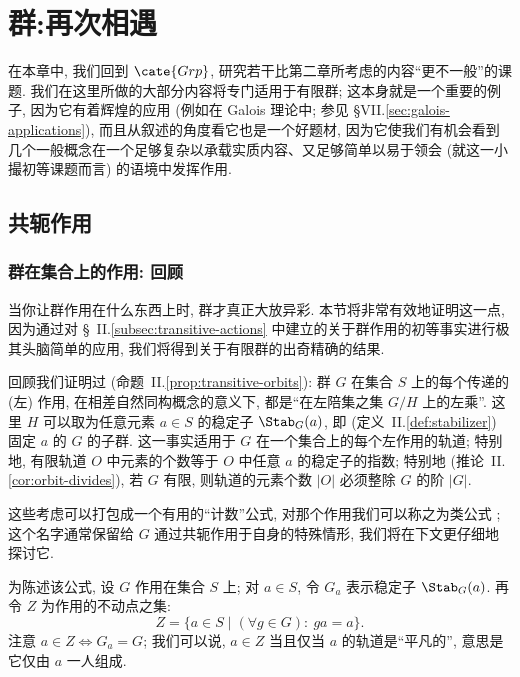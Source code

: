 
\chapter{群:再次相遇}
\label{chap:groups2}

在本章中, 我们回到 $\cate{Grp}$, 研究若干比第二章所考虑的内容``更不一般''的课题. 我们在这里所做的大部分内容将专门适用于有限群; 这本身就是一个重要的例子, 因为它有着辉煌的应用 (例如在 Galois 理论中; 参见 \S VII.\ref{sec:galois-applications}), 而且从叙述的角度看它也是一个好题材, 因为它使我们有机会看到几个一般概念在一个足够复杂以承载实质内容、又足够简单以易于领会 (就这一小撮初等课题而言) 的语境中发挥作用.

\section{共轭作用}
\label{sec:conjugation}

\subsection{群在集合上的作用: 回顾}
\label{subsec:actions-reminder}

当你让群作用在什么东西上时, 群才真正大放异彩. 本节将非常有效地证明这一点, 因为通过对 \S~II.\ref{subsec:transitive-actions} 中建立的关于群作用的初等事实进行极其头脑简单的应用, 我们将得到关于有限群的出奇精确的结果.

回顾我们证明过 (命题~II.\ref{prop:transitive-orbits}): 群 $G$ 在集合 $S$ 上的每个传递的 (左) 作用, 在相差自然同构概念的意义下, 都是``在左陪集之集 $G/H$ 上的左乘''. 这里 $H$ 可以取为任意元素 $a \in S$ 的稳定子 $\Stab_G(a)$, 即 (定义~II.\ref{def:stabilizer}) 固定 $a$ 的 $G$ 的子群. 这一事实适用于 $G$ 在一个集合上的每个左作用的轨道; 特别地, 有限轨道 $O$ 中元素的个数等于 $O$ 中任意 $a$ 的稳定子的指数; 特别地 (推论~II.\ref{cor:orbit-divides}), 若 $G$ 有限, 则轨道的元素个数 $|O|$ 必须整除 $G$ 的阶 $|G|$.

这些考虑可以打包成一个有用的``计数''公式, 对那个作用我们可以称之为类公式%
; 这个名字通常保留给 $G$ 通过共轭作用于自身的特殊情形, 我们将在下文更仔细地探讨它.

为陈述该公式, 设 $G$ 作用在集合 $S$ 上; 对 $a \in S$, 令 $G_a$ 表示稳定子 $\Stab_G(a)$. 再令 $Z$ 为作用的不动点之集:
\[
Z = \{a \in S \mid (\forall g \in G):\ ga = a\}.
\]
注意 $a \in Z \iff G_a = G$; 我们可以说, $a \in Z$ 当且仅当 $a$ 的轨道是``平凡的'', 意思是它仅由 $a$ 一人组成.

